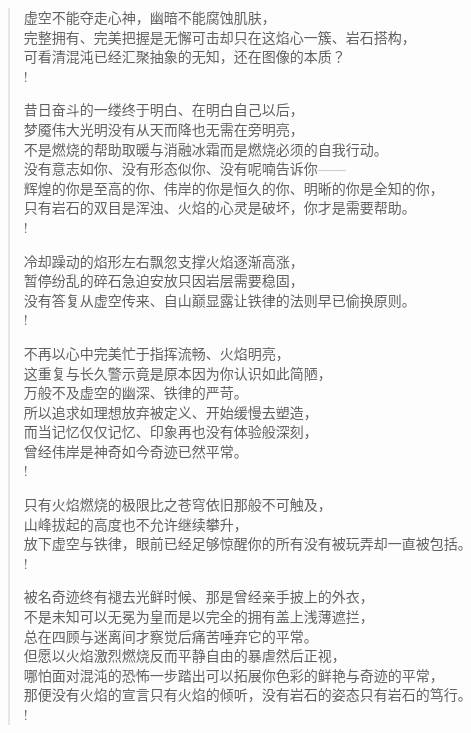 \documentclass[UTF8, 12pt, a4paper]{ctexrep} %
\begin{document}
\begin{verse}
虚空不能夺走心神，幽暗不能腐蚀肌肤，\\
完整拥有、完美把握是无懈可击却只在这焰心一簇、岩石搭构，\\
可看清混沌已经汇聚抽象的无知，还在图像的本质？\\!

昔日奋斗的一缕终于明白、在明白自己以后，\\
梦魇伟大光明没有从天而降也无需在旁明亮，\\
不是燃烧的帮助取暖与消融冰霜而是燃烧必须的自我行动。\\
没有意志如你、没有形态似你、没有呢喃告诉你——\\
辉煌的你是至高的你、伟岸的你是恒久的你、明晰的你是全知的你，\\
只有岩石的双目是浑浊、火焰的心灵是破坏，你才是需要帮助。\\!

冷却躁动的焰形左右飘忽支撑火焰逐渐高涨，\\
暂停纷乱的碎石急迫安放只因岩层需要稳固，\\
没有答复从虚空传来、自山巅显露让铁律的法则早已偷换原则。\\!

不再以心中完美忙于指挥流畅、火焰明亮，\\
这重复与长久警示竟是原本因为你认识如此简陋，\\
万般不及虚空的幽深、铁律的严苛。\\
所以追求如理想放弃被定义、开始缓慢去塑造，\\
而当记忆仅仅记忆、印象再也没有体验般深刻，\\
曾经伟岸是神奇如今奇迹已然平常。\\!

只有火焰燃烧的极限比之苍穹依旧那般不可触及，\\
山峰拔起的高度也不允许继续攀升，\\
放下虚空与铁律，眼前已经足够惊醒你的所有没有被玩弄却一直被包括。\\!

被名奇迹终有褪去光鲜时候、那是曾经亲手披上的外衣，\\
不是未知可以无冕为皇而是以完全的拥有盖上浅薄遮拦，\\
总在四顾与迷离间才察觉后痛苦唾弃它的平常。\\
但愿以火焰激烈燃烧反而平静自由的暴虐然后正视，\\
哪怕面对混沌的恐怖一步踏出可以拓展你色彩的鲜艳与奇迹的平常，\\
那便没有火焰的宣言只有火焰的倾听，没有岩石的姿态只有岩石的笃行。\\!


\end{verse}
\end{document}
